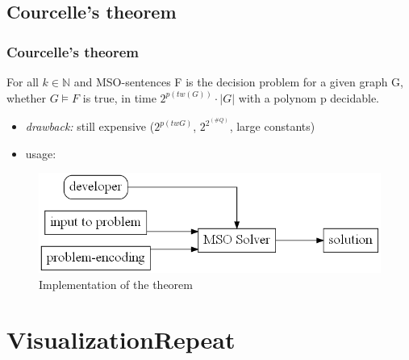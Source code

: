 \documentclass[c,8pt,xcolor...,x11names]{beamer}
\begin{document}
\subsection[Courcelle]{Courcelle's theorem}
\begin{frame}
	\frametitle{Courcelle's theorem}


	\medskip
	For all $k \in \mathbb{N}$ and MSO-sentences F is the decision problem for a given graph G, whether $G \models F$ is true, in time $2^{p(tw(G))} \cdot |G|$ with a polynom p decidable.
	\medskip
	\begin{itemize}

		\item \emph{drawback:} still expensive ($2^{p(tw G)}$, $2^{2^{(\#Q)}}$, large constants) \smallskip 
		\item usage:

	\end{itemize}
	\begin{figure}
		\includegraphics[height=0.2\textheight]{images/UsageCourcelle.gv.png}
		\caption{Implementation of the theorem}
	\end{figure}
\end{frame}


\section{VisualizationRepeat}
\end{document}
